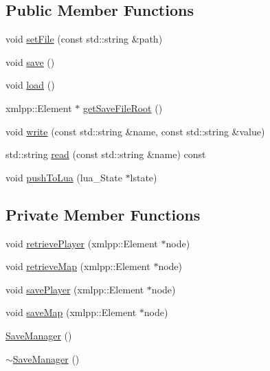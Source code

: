 \subsection*{Public Member Functions}
\begin{DoxyCompactItemize}
\item 
void \hyperlink{classZeta_1_1SaveManager_ae2b12abe95b617c9cf648b1e934f32de}{set\+File} (const std\+::string \&path)
\item 
void \hyperlink{classZeta_1_1SaveManager_a9c2ad5c1f46820364bb7069b3210bfd3}{save} ()
\item 
void \hyperlink{classZeta_1_1SaveManager_af710d9514c282b0c2ad3241129db2c9d}{load} ()
\item 
xmlpp\+::\+Element $\ast$ \hyperlink{classZeta_1_1SaveManager_a5ecfa156a86e386839462f81b6cf7876}{get\+Save\+File\+Root} ()
\item 
void \hyperlink{classZeta_1_1SaveManager_a137ffc0553ab71e347ed2c5f90f63afd}{write} (const std\+::string \&name, const std\+::string \&value)
\item 
std\+::string \hyperlink{classZeta_1_1SaveManager_aefcf49f2e8712a999d710e94724305eb}{read} (const std\+::string \&name) const 
\item 
void \hyperlink{classZeta_1_1SaveManager_aadb7174777b902b5ac5fd477a28274b7}{push\+To\+Lua} (lua\+\_\+\+State $\ast$lstate)
\end{DoxyCompactItemize}
\subsection*{Private Member Functions}
\begin{DoxyCompactItemize}
\item 
void \hyperlink{classZeta_1_1SaveManager_a31218fc86079c1af8c75379b17531042}{retrieve\+Player} (xmlpp\+::\+Element $\ast$node)
\item 
void \hyperlink{classZeta_1_1SaveManager_a3965ccc6c602f25563c07ae64c9eef07}{retrieve\+Map} (xmlpp\+::\+Element $\ast$node)
\item 
void \hyperlink{classZeta_1_1SaveManager_af24a1731daba5561770a663a32607c81}{save\+Player} (xmlpp\+::\+Element $\ast$node)
\item 
void \hyperlink{classZeta_1_1SaveManager_a78b9ff589296056df3c9668e06cceecd}{save\+Map} (xmlpp\+::\+Element $\ast$node)
\item 
\hyperlink{classZeta_1_1SaveManager_a259e51095034ed0508435cd82c773749}{Save\+Manager} ()
\item 
\hyperlink{classZeta_1_1SaveManager_a914cdeaa9169406acb886bfd9bb5e0bc}{$\sim$\+Save\+Manager} ()
\end{DoxyCompactItemize}

